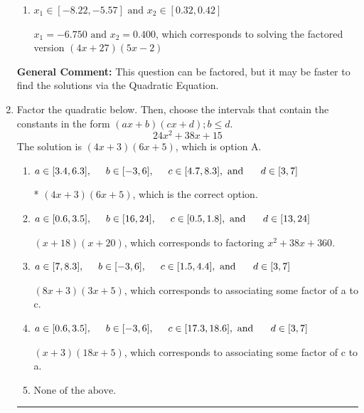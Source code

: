 \documentclass{extbook}[14pt]
\newcommand{\litem}[1]{\item #1

\rule{\textwidth}{0.4pt}}
\begin{document}
\begin{enumerate}
{\begin{enumerate}[label=\Alph*.]
* $x_1 = -2.250 \text{ and } x_2 = 1.200$, which is the correct option. Obtained by solving the factored version $(4x + 9)(5x -6)$
\item \( x_1 \in [-8.22, -5.57] \text{ and } x_2 \in [0.32, 0.42] \)

$x_1 = -6.750 \text{ and } x_2 = 0.400$, which corresponds to solving the factored version $(4x + 27)(5x -2)$
\end{enumerate}

\textbf{General Comment:} This question can be factored, but it may be faster to find the solutions via the Quadratic Equation.
}
\litem{
Factor the quadratic below. Then, choose the intervals that contain the constants in the form $(ax+b)(cx+d); b \leq d.$
\[ 24x^{2} +38 x + 15 \]The solution is \( (4x + 3)(6x + 5) \), which is option A.\begin{enumerate}[label=\Alph*.]
\item \( a \in [3.4, 6.3], \hspace*{5mm} b \in [-3, 6], \hspace*{5mm} c \in [4.7, 8.3], \text{ and } \hspace*{5mm} d \in [3, 7] \)

* $(4x + 3)(6x + 5)$, which is the correct option.
\item \( a \in [0.6, 3.5], \hspace*{5mm} b \in [16, 24], \hspace*{5mm} c \in [0.5, 1.8], \text{ and } \hspace*{5mm} d \in [13, 24] \)

 $(x + 18)(x + 20)$, which corresponds to factoring $x^{2} +38 x + 360$.
\item \( a \in [7, 8.3], \hspace*{5mm} b \in [-3, 6], \hspace*{5mm} c \in [1.5, 4.4], \text{ and } \hspace*{5mm} d \in [3, 7] \)

 $(8x + 3)(3x + 5)$, which corresponds to associating some factor of a to c.
\item \( a \in [0.6, 3.5], \hspace*{5mm} b \in [-3, 6], \hspace*{5mm} c \in [17.3, 18.6], \text{ and } \hspace*{5mm} d \in [3, 7] \)

 $(x + 3)(18x + 5)$, which corresponds to associating some factor of c to a.
\item \( \text{None of the above.} \)


\end{enumerate}}
\end{enumerate}
\end{document}

